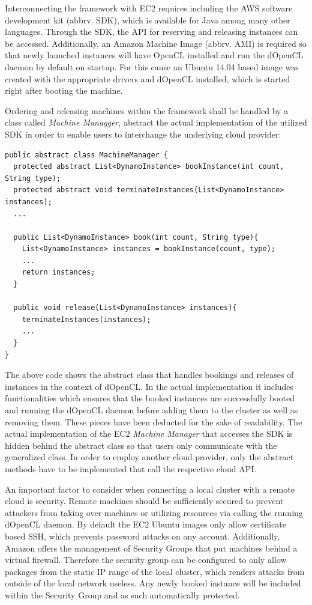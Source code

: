 Interconnecting the framework with EC2 requires including the AWS software development kit (abbrv. SDK), which is available for Java among many other languages. Through the SDK, the API for reserving and releasing instances can be accessed. Additionally, an Amazon Machine Image (abbrv. AMI) is required so that newly launched instances will have OpenCL installed and run the dOpenCL daemon by default on startup. For this cause an Ubuntu 14.04 based image was created with the appropriate drivers and dOpenCL installed, which is started right after booting the machine.

Ordering and releasing machines within the framework shall be handled by a class called \textit{Machine Managger}, abstract the actual implementation of the utilized SDK in order to enable users to interchange the underlying cloud provider:


\begin{lstlisting}
public abstract class MachineManager {
  protected abstract List<DynamoInstance> bookInstance(int count, String type);
  protected abstract void terminateInstances(List<DynamoInstance> instances);
  ...

  public List<DynamoInstance> book(int count, String type){
    List<DynamoInstance> instances = bookInstance(count, type);
    ...
    return instances;
  }

  public void release(List<DynamoInstance> instances){
    terminateInstances(instances);
    ...
  }
}
\end{lstlisting}

The above code shows the abstract class that handles bookings and releases of instances in the context of dOpenCL. In the actual implementation it includes functionalities which ensures that the booked instances are successfully booted and running the dOpenCL daemon before adding them to the cluster as well as removing them. These pieces have been deducted for the sake of readability. The actual implementation of the EC2 \textit{Machine Manager} that accesses the SDK is hidden behind the abstract class so that users only communicate with the generalized class. In order to employ another cloud provider, only the abstract methods have to be implemented that call the respective cloud API.

An important factor to consider when connecting a local cluster with a remote cloud is security. Remote machines should be sufficiently secured to prevent attackers from taking over machines or utilizing resources via calling the running dOpenCL daemon. By default the EC2 Ubuntu images only allow certificate based SSH, which prevents password attacks on any account. Additionally, Amazon offers the management of Security Groups that put machines behind a virtual firewall. Therefore the security group can be configured to only allow packages from the static IP range of the local cluster, which renders attacks from outside of the local network useless. Any newly booked instance will be included within the Security Group and as such automatically protected.


